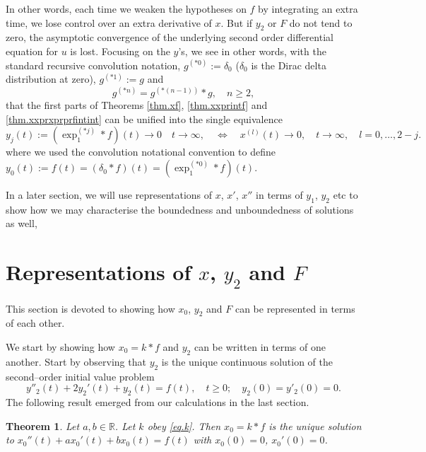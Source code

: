 \documentclass[10pt,reqno]{amsart}
\newtheorem{theorem}{Theorem}
\theoremstyle{definition}
\begin{document}
	In other words, each time we weaken the hypotheses on $f$ by integrating an extra time, we lose control over an extra derivative of $x$. But if $y_2$ or $F$ do not tend to zero, the asymptotic convergence of the underlying second order differential equation for $u$ is lost. Focusing on the $y$'s, we see in other words, with the standard recursive convolution notation, $g^{(*0)}:=\delta_0$ ($\delta_0$ is the Dirac delta distribution at zero), $g^{(*1)}:=g$ and 
	\[
	g^{(*n)}=g^{(*(n-1))}*g, \quad n\geq 2,
	\]
	that  the first parts of Theorems  \ref{thm.xf}, \ref{thm.xxprintf} and \ref{thm.xxprxprprfintint} can be unified into the single equivalence 
	\[
	y_j(t):=(\exp_1^{(*j)}*f)(t) \to 0 \quad t\to\infty, \quad \Longleftrightarrow \quad x^{(l)}(t)\to 0, \quad t\to\infty, \quad l=0,\ldots,2-j.
	\]
	where we used the convolution notational convention to define $y_0(t):=f(t)=(\delta_0\ast f)(t)=(\exp_1^{(*0)}*f)(t)$.
	
	
	In a later section, we will use representations of $x$, $x'$, $x''$ in terms of $y_1$, $y_2$ etc to show how we may characterise the boundedness and unboundedness of solutions as well, 
	
	\section{Representations of $x$, $y_2$ and $F$}
	This section is devoted to showing how $x_0$, $y_2$ and $F$ can be represented in terms of each other.
	
	We start by showing how $x_0=k\ast f$ and $y_2$ can be written in terms of one another. Start by observing that $y_2$ is the unique continuous solution of the second--order initial value problem 
	\[
	y''_2(t) + 2y_2'(t) + y_2(t) = f(t), \quad t \geq 0; \quad y_2(0)=y'_2(0)=0.
	\]
	The following result emerged from our calculations in the last section. 
	\begin{theorem}
		Let $a, b \in \mathbb{R}$. Let $k$ obey \eqref{eq.k}. Then $x_0=k\ast f$ is the unique solution to $x_0''(t)+ax_0'(t)+bx_0(t)=f(t)$ with $x_0(0)=0$, $x_0'(0)=0$. 
	\end{theorem}
	
\end{document}
